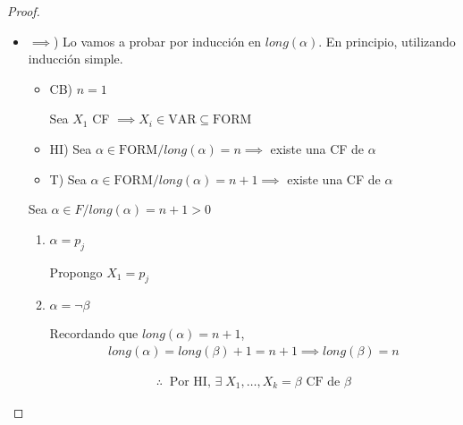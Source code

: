 \begin{proof} \phantom{.}

    \begin{itemize}
        \item $\implies$) Lo vamos a probar por inducción en $long(\alpha)$.
            En principio, utilizando inducción simple.

        \begin{itemize}
            \item CB) $n=1$

                Sea $X_1$ CF
                $\implies X_i \in \mathrm{VAR} \subseteq \mathrm{FORM}$
            \item HI) Sea $\alpha \in \mathrm{FORM}/ long(\alpha) = n \implies$ 
                existe una CF de $\alpha$
            \item T) Sea $\alpha \in \mathrm{FORM}/ long(\alpha) = n + 1 \implies$
                existe una CF de $\alpha$ 
        \end{itemize}
        
        \medskip

        Sea $\alpha \in F / long(\alpha) = n + 1 > 0$

        \begin{enumerate}[%
                labelindent=*,
                style=multiline,
                leftmargin=*,
                align=left,
                leftmargin=2\parindent,
                label=Caso \arabic*)]
            \item $\alpha = p_j$

                Propongo $X_1 = p_j$

            \item $\alpha = \neg \beta$ %

                Recordando que $long(\alpha) = n+1$,
                \begin{gather*}
                    long(\alpha) = long(\beta) + 1 = n + 1 \implies 
                    long(\beta) = n
                \end{gather*}

                \begin{gather*}
                    \therefore ~ \text{ Por HI, } \exists \; X_1, 
                    \dotsc, X_k = \beta \text{ CF de } \beta
                \end{gather*}


\end{enumerate}
\end{itemize}
\end{proof}
